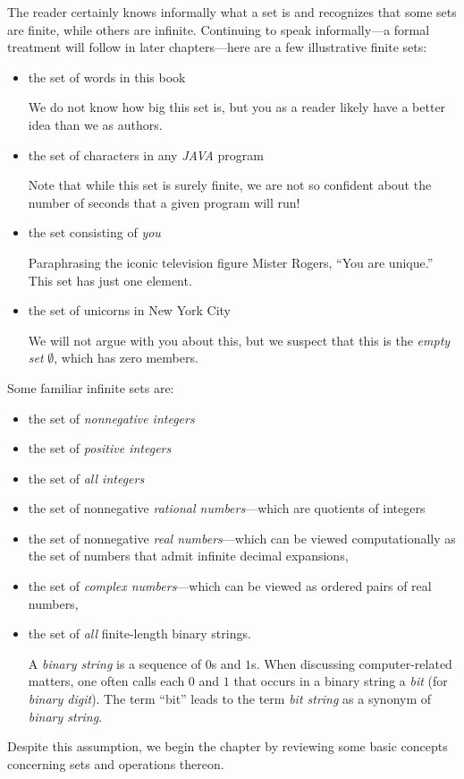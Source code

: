 The reader certainly knows informally what a set is and recognizes
that some sets are finite, while others are infinite.  Continuing to
speak informally---a formal treatment will follow in later
chapters---here are a few illustrative finite sets:
\begin{itemize}
\item
the set of words in this book

We do not know how big this set is, but you as a reader likely have a
better idea than we as authors.
\item
the set of characters in any {\it JAVA} program

Note that while this set is surely finite, we are not so confident
about the number of seconds that a given program will run!
\item
the set consisting of {\em you}

Paraphrasing the iconic television figure Mister Rogers, ``You are
unique.''  This set has just one element.

\item
the set of unicorns in New York City

We will not argue with you about this, but we suspect that this is the
{\em empty set} $\emptyset$, which has zero members.
\end{itemize}
Some familiar infinite sets are:
\begin{itemize}
\item
the set of {\em nonnegative integers}
\item
the set of {\em positive integers}
\item
the set of {\em all integers}
\item
the set of nonnegative {\em rational numbers}---which are quotients of
integers
\item
the set of nonnegative {\em real numbers}---which can be viewed
computationally as the set of numbers that admit infinite decimal
expansions,
\item
the set of {\em complex numbers}---which can be viewed as ordered
pairs of real numbers,
\item
the set of {\em all} finite-length binary strings.

A {\it binary string} is a sequence of $0$s and
$1$s.  When discussing computer-related matters, one often calls each
$0$ and $1$ that occurs in a binary string a {\it bit} (for {\it binary digit}).  The term ``bit'' leads to
the term {\it bit string} as a synonym of {\it binary string}.
\end{itemize}
Despite this assumption, we begin the chapter by reviewing some basic
concepts concerning sets and operations thereon.

